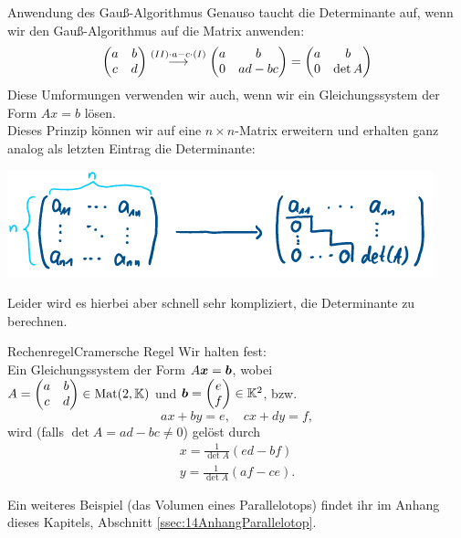 \begin{Beispiel}{Anwendung des Gauß-Algorithmus}
Genauso taucht die Determinante auf, wenn wir den Gauß-Algorithmus auf die Matrix anwenden:
\begin{equation}
    \begin{pmatrix}a&b\\c&d\end{pmatrix}\overset{(II)\cdot a-c\cdot(I)}{\longrightarrow}\begin{pmatrix}a&b\\0&ad-bc\end{pmatrix}=\begin{pmatrix}a&b\\0&\det A\end{pmatrix}
\end{equation}
Diese Umformungen verwenden wir auch, wenn wir ein Gleichungssystem der Form $Ax=b$ lösen.\\
Dieses Prinzip können wir auf eine $n\times n$-Matrix erweitern und erhalten ganz analog als letzten Eintrag die Determinante:
\begin{center}
\includegraphics[width=.5\textwidth]{Dateien/00/14DeterminanteNKreuzN.PNG}
\end{center}
Leider wird es hierbei aber schnell sehr kompliziert, die Determinante zu berechnen.
\end{Beispiel}
\begin{Satz}{Rechenregel}{Cramersche Regel}
Wir halten fest:\\
Ein Gleichungssystem der Form $A{{\text{\boldmath${x}$}}}={{\text{\boldmath${b}$}}}$, wobei\\ $A=\begin{pmatrix}a&b\\c&d\end{pmatrix}\in\text{Mat}(2,\mathbb{K})$ und ${{\text{\boldmath${b}$}}}=\begin{pmatrix}e\\f\end{pmatrix}\in\mathbb{K}^2$, bzw.
\begin{equation*}
    ax+by=e,\quad cx+dy=f,
\end{equation*}
wird (falls $\det A=ad-bc\neq0$) gelöst durch
\begin{align*}
    x=\frac{1}{\det A}(ed-bf)\\
    y=\frac{1}{\det A}(af-ce).
\end{align*}
\end{Satz}
Ein weiteres Beispiel (das Volumen eines Parallelotops) findet ihr im Anhang dieses Kapitels, Abschnitt \ref{ssec:14AnhangParallelotop}.



